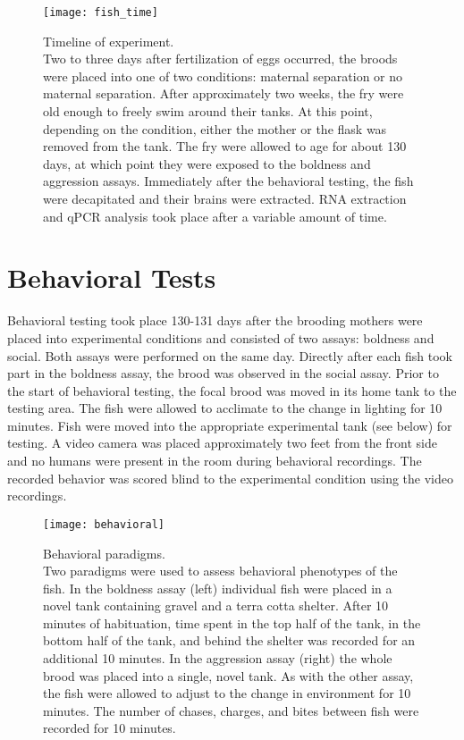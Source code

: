 \documentclass[12pt,twoside]{reedthesis}
\begin{document}
\begin{figure}[htbp] 
\begin{centering} 
\texttt{[image: fish\_time]}
\caption[Timeline of experiment]{\footnotesize{Timeline of experiment.\\ Two to
    three days after fertilization of eggs occurred, the broods were placed into
  one of two conditions: maternal separation or no maternal separation. After
  approximately two weeks, the fry were old enough to freely swim around their
  tanks. At this point, depending on the condition, either the mother or the
  flask was removed from the tank. The fry were allowed to age for about 130
  days, at which point they were exposed to the boldness and aggression assays.
  Immediately after the behavioral testing, the fish were decapitated and their
  brains were extracted. RNA extraction and qPCR analysis took place after a variable
  amount of time.}} 
\label{time}
\end{centering} 
\end{figure}

\section{Behavioral Tests}

Behavioral testing took place 130-131 days after the brooding mothers were
placed into experimental conditions and consisted of two assays: boldness and social. Both assays were performed on the same day.
Directly after each fish took part in the boldness assay, the brood was observed in the
social assay.
Prior to the start of behavioral testing, the focal brood was moved in its home tank to the
testing area. The fish were allowed to acclimate to the change in lighting for 10
minutes. Fish were moved into the appropriate experimental tank (see below) for
testing. A video camera was placed approximately two
feet from the front side and no humans were present in the room during behavioral
recordings. The recorded behavior was scored blind to the experimental condition using the video recordings.

\begin{figure}[htbp] 
\begin{centering} 
\texttt{[image: behavioral]}
\caption[Behavioral paradigms]{\footnotesize{Behavioral paradigms. \\ Two paradigms were used to assess
  behavioral phenotypes of the fish. In the boldness assay (left) individual
  fish were placed in a novel tank containing gravel and a terra cotta shelter.
  After 10 minutes of habituation, time spent in the top half of the tank, in
  the bottom half of the tank, and behind the shelter was recorded for an
  additional 10 minutes. In the
  aggression assay (right) the whole brood was placed into a single, novel tank.
  As with the other assay, the fish were allowed to adjust to the change in
  environment for 10 minutes.
The number of chases, charges, and bites between fish were recorded for 10 minutes.}}
\label{behavioral}
\end{centering} 
\end{figure}
\end{document}
